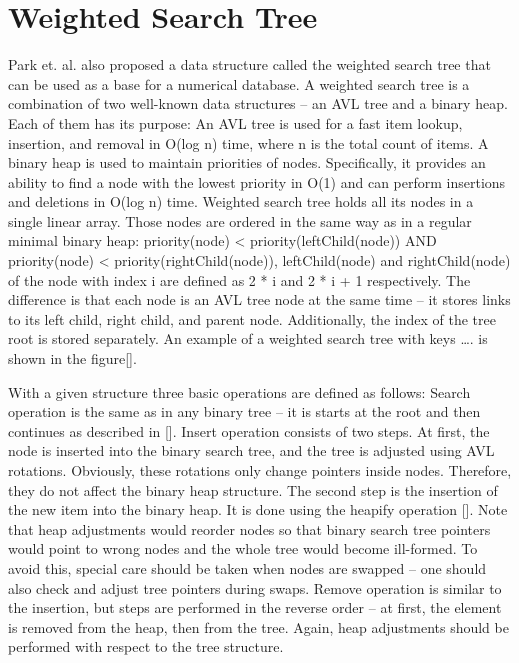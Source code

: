 \section{Weighted Search Tree}

Park et. al. also proposed a data structure called the weighted search tree that can be used as a base for a numerical database. A weighted search tree is a combination of two well-known data structures – an AVL tree and a binary heap. Each of them has its purpose:
An AVL tree is used for a fast item lookup, insertion, and removal in O(log n) time, where n is the total count of items.
A binary heap is used to maintain priorities of nodes. Specifically, it provides an ability to find a node with the lowest priority in O(1) and can perform insertions and deletions in O(log n) time.
Weighted search tree holds all its nodes in a single linear array. Those nodes are ordered in the same way as in a regular minimal binary heap:
priority(node) < priority(leftChild(node)) AND
priority(node) < priority(rightChild(node)),
leftChild(node) and rightChild(node) of the node with index i are defined as 2 * i  and 2 * i + 1 respectively.
The difference is that each node is an AVL tree node at the same time – it stores links to its left child, right child, and parent node. Additionally, the index of the tree root is stored separately. An example of a weighted search tree with keys …. is shown in the figure[].

With a given structure three basic operations are defined as follows:
Search operation is the same as in any binary tree – it is starts at the root and then continues as described in [].
Insert operation consists of two steps. At first, the node is inserted into the binary search tree, and the tree is adjusted using AVL rotations. Obviously, these rotations only change pointers inside nodes. Therefore, they do not affect the binary heap structure. The second step is the insertion of the new item into the binary heap. It is done using the heapify operation []. Note that heap adjustments would reorder nodes so that binary search tree pointers would point to wrong nodes and the whole tree would become ill-formed. To avoid this, special care should be taken when nodes are swapped – one should also check and adjust tree pointers during swaps.
Remove operation is similar to the insertion, but steps are performed in the reverse order – at first, the element is removed from the heap, then from the tree. Again, heap adjustments should be performed with respect to the tree structure.


